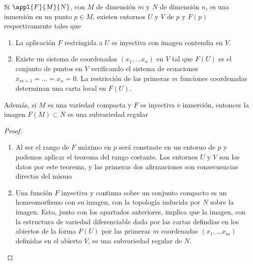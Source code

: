 \begin{theorem}
Si $\appl{F}{M}{N}$, con $M$ de dimensión $m$ y $N$ de dimensión $n$, es una inmersión en un punto $p \in M$, existen entornos $U$ y $V$ de $p$ y $F(p)$ respectivamente tales que
\begin{enumerate}
\item La aplicación $F$ restringida a $U$ es inyectiva con imagen contendia en $V$.
\item Existe un sistema de coordenadas $(x_1,...x_n)$ en $V$ tal que $F(U)$ es el conjunto de puntos en $V$ verificando el sistema de ecuaciones $x_{m+1}=...=x_n=0$. La restricción de las primeras $m$ funciones coordenadas determinan una carta local en $F(U)$.
\end{enumerate}

Además, si $M$ es una variedad compacta y $F$ es inyectiva e inmersión, entonces la imagen $F(M)\subset N$ es una subvariedad regular
\end{theorem}
\begin{proof}
\begin{enumerate}
\item Al ser el rango de $F$ máximo en $p$ será constnate en un entorno de $p$ y podemos aplicar el teorema del rango costante. Los entornos $U$ y $V$ son los datos por este teorema, y las primeras dos afirmaciones son consecuencias directas del mismo

\item Una función $F$ inyectiva y continua sobre un conjunto compacto es un homeomorfismo con su imagen, con la topología inducida por $N$ sobre la imagen. Esto, junto con los apartados anteriores, implica que la imagen, con la estructura de variedad diferenciable dada por las cartas defindias en los abiertos de la forma $F(U)$ por las primeras $m$ coordenadas $(x_1,...x_m)$ definidas en el abierto $V$, es una subvariedad regular de $N$.
\end{enumerate}
\end{proof}

%
%

